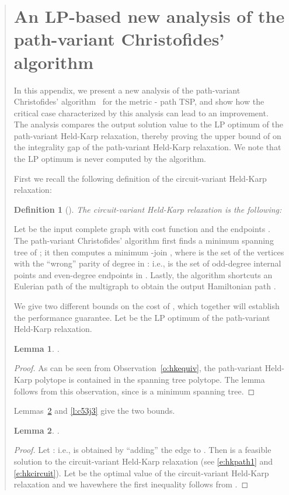 \documentclass[11pt,letterpaper]{article}
\newtheorem{lemma}{Lemma}
\newtheorem{defn}{Definition}
\newcommand{\st}{\mbox{-} }
\begin{document}
\begin{quote}


\appendix

\section{An LP-based new analysis of the path-variant Christofides' algorithm}\label{ap:c53}

In this appendix, we present a new analysis of the path-variant Christofides' algorithm~\cite{C, H} for the metric \st path TSP, and show how the critical case characterized by this analysis can lead to an improvement. The analysis compares the output solution value to the LP optimum of the path-variant Held-Karp relaxation, thereby proving the upper bound of  on the integrality gap of the path-variant Held-Karp relaxation. We note that the LP optimum is never computed by the algorithm.

First we recall the following definition of the circuit-variant Held-Karp relaxation:
\begin{defn}[\cite{HK}]
\label{d:hkcircuit}
The \emph{circuit-variant Held-Karp relaxation} is the following:
\end{defn}

Let  be the input complete graph with cost function  and the endpoints . The path-variant Christofides' algorithm first finds a minimum spanning tree  of ; it then computes a minimum -join , where  is the set of the vertices with the ``wrong'' parity of degree in : i.e.,  is the set of odd-degree internal points and even-degree endpoints in . Lastly, the algorithm shortcuts an Eulerian path of the multigraph  to obtain the output Hamiltonian path .

We give two different bounds on the cost of , which together will establish the performance guarantee. Let  be the LP optimum of the path-variant Held-Karp relaxation.

\begin{lemma}
\label{l:c53j1}
.
\end{lemma}
\begin{proof}
As can be seen from Observation~\ref{o:hkequiv}, the path-variant Held-Karp polytope is contained in the spanning tree polytope. The lemma follows from this observation, since  is a minimum spanning tree.
\end{proof}

Lemmas~\ref{l:c53j2} and \ref{l:c53j3} give the two bounds.

\begin{lemma}
\label{l:c53j2}
.
\end{lemma}
\begin{proof}
Let : i.e.,  is obtained by ``adding'' the edge  to . Then  is a feasible solution to the circuit-variant Held-Karp relaxation (see \eqref{e:hkpath1} and \eqref{e:hkcircuit}). Let  be the optimal value of the circuit-variant Held-Karp relaxation and we havewhere the first inequality follows from \cite{W, SW}.
\end{proof}


\end{quote}
\end{document}
